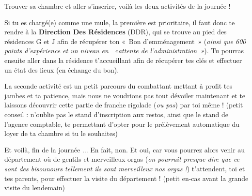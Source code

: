 Trouver sa chambre et aller s'inscrire, voilà les deux activités de la journée !

Si tu es chargé(e) comme une mule, la première est prioritaire, il faut donc te
rendre à la \textbf{Direction Des Résidences} (DDR), qui se trouve au pied des résidences
G et J afin de récupérer ton «~Bon d'emménagement~» (\emph{ainsi que 600 points
d'expérience et un niveau en ~«attente de l'administration~»}).
Tu pourras ensuite aller dans la résidence t'accueillant afin de récupérer tes
clés et effectuer un état des lieux (en échange du bon).

La seconde activité est un petit parcours du combattant mettant à profit tes 
jambes et ta patience, mais nous ne voudrions pas tout dévoiler maintenant et
te laissons découvrir cette partie de franche rigolade (\emph{ou pas}) par toi même !
(petit conseil : n'oublie pas le stand d'inscription aux restos, ainsi que le
 stand de l'agence comptable, te permettant d'opter pour le prélèvement
 automatique du loyer de ta chambre si tu le souhaites)

Et voilà, fin de la journée ... En fait, non.
Et oui, car vous pourrez alors venir au département où de gentils et merveilleux
orgas (\emph{on pourrait presque dire que ce sont des bisounours tellement ils sont
merveilleux nos orgas !}) t'attendent, toi et tes parents, pour effectuer
la visite du département ! (petit en-cas avant la grande visite du lendemain) 

